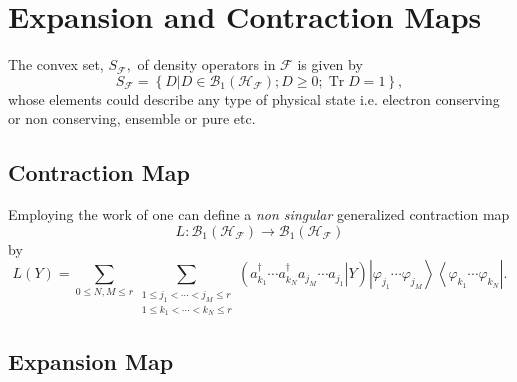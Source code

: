 \documentclass[aps,preprint]{revtex4}%
\begin{document}
\section{Expansion and Contraction Maps \label{Expansion and Contraction}}

The convex set, $S_{\mathcal{F}},$ of density operators in $\mathcal{F}$ is
given by
\begin{equation}
S_{\mathcal{F}}=\left\{  D\left\vert D\in\mathcal{B}_{1}\left(  \mathcal{H}%
_{\mathcal{F}}\right)  ;D\geq0;\operatorname{Tr}D=1\right.  \right\}  ,
\end{equation}
whose elements could describe any type of physical state i.e. electron
conserving or non conserving, ensemble or pure etc.

\subsection{Contraction Map \label{Contraction}}

Employing the work of \cite{Kummar70} one can define a \emph{non singular
}generalized contraction map
\begin{equation}
L:\mathcal{B}_{1}\left(  \mathcal{H}_{\mathcal{F}}\right)  \rightarrow
\mathcal{B}_{1}\left(  \mathcal{H}_{\mathcal{F}}\right)
\end{equation}
by
\begin{equation}
L\left(  Y\right)  =\sum_{0\leq N,M\leq r}\sum_{\substack{1\leq j_{1}%
<\cdots<j_{M}\leq r\\1\leq k_{1}<\cdots<k_{N}\leq r}}\left(  \left.  a_{k_{1}%
}^{\dagger}\cdots a_{k_{N}}^{\dagger}a_{j_{M}}\cdots a_{j_{1}}\right\vert
Y\right)  \left\vert \varphi_{j_{1}}\cdots\varphi_{j_{M}}\right\rangle
\left\langle \varphi_{k_{1}}\cdots\varphi_{k_{N}}\right\vert . \label{CONT}%
\end{equation}


\subsection{Expansion Map \label{Expansion}}
\end{document}
